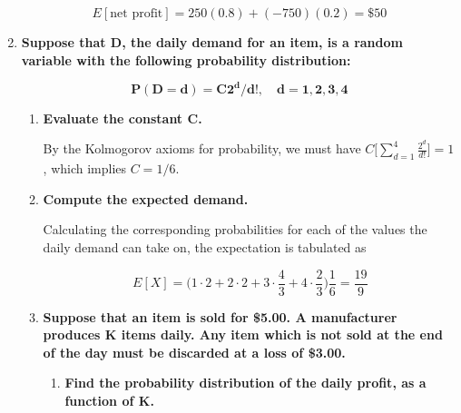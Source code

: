 \documentclass[10pt, oneside]{article}   	%
\theoremstyle{definition}
\begin{document}
\begin{enumerate}[label=7.\arabic*]
\[ E[\text{net profit}] = 250(0.8) + (-750)(0.2) = \boxed{\$50} \]

\item  \begin{tcolorbox}[
  colback=Cerulean!5!white,
  colframe=Cerulean!75!black]
\textbf{Suppose that $\bm{D}$, the daily demand for an item, is a random variable with the following probability distribution:}

\[ \bm{P(D=d) = C 2^d / d!,  \quad d = 1, 2, 3, 4} \]
\end{tcolorbox}

	\begin{enumerate}
	\item  \begin{tcolorbox}[
	  colback=Cerulean!5!white,
	  colframe=Cerulean!75!black]
	\textbf{Evaluate the constant $\bm{C}$.}
	\end{tcolorbox}
	
	By the Kolmogorov axioms for probability, we must have $C \Big[ \sum^4_{d=1} \frac{2^d}{d!} \Big] = 1$, which implies $\boxed{C = 1/6}$.
	
	\item  \begin{tcolorbox}[
	  colback=Cerulean!5!white,
	  colframe=Cerulean!75!black]
	\textbf{Compute the expected demand.}
	\end{tcolorbox}
	
	Calculating the corresponding probabilities for each of the values the daily demand can take on, the expectation is tabulated as
	
	\[ E[X] = \Big( 1 \cdot 2 + 2 \cdot 2 + 3 \cdot \frac{4}{3} + 4 \cdot \frac{2}{3} \Big) \frac{1}{6} = \boxed{\frac{19}{9}} \]
	
	\item  \begin{tcolorbox}[
	  colback=Cerulean!5!white,
	  colframe=Cerulean!75!black]
	\textbf{Suppose that an item is sold for \$5.00. A manufacturer produces $\bm{K}$ items daily. Any item which is not sold at the end of the day must be discarded at a loss of \$3.00. }
	\end{tcolorbox}
	
		\begin{enumerate}
		\item  \begin{tcolorbox}[
	 	 colback=Cerulean!5!white,
	 	 colframe=Cerulean!75!black]
		\textbf{Find the probability distribution of the daily profit, as a function of $\bm{K}$.}
		\end{tcolorbox}
		

\end{enumerate}
\end{enumerate}
\end{enumerate}
\end{document}
